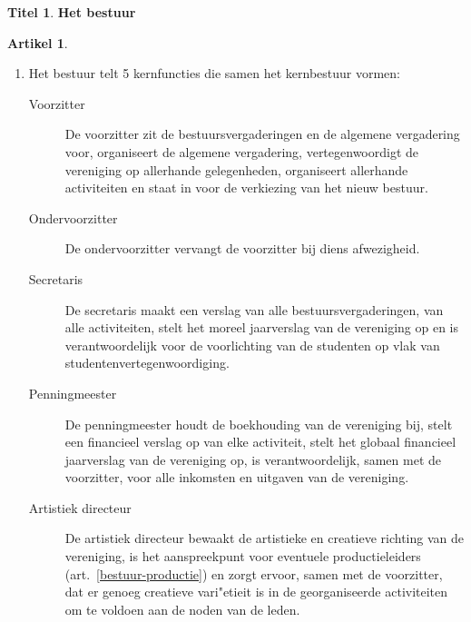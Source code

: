 \documentclass[a4paper,10pt]{article}
\theoremstyle{definition}
\newtheorem{titel}{\newline\Large Titel}
\newtheorem{artikel}{\large Artikel}
\newcommand{\ttext}[1]{\Large \textbf{#1} \normalsize}
\newcommand{\ttextenum}{\mbox{}}
\begin{document}
\begin{titel}\ttext{Het bestuur}

  \begin{artikel}\ttextenum
    \begin{enumerate}
      \item Het bestuur telt 5 kernfuncties die samen het kernbestuur vormen:
      \begin{description}
        \item[Voorzitter]
          De voorzitter zit de bestuursvergaderingen en de algemene vergadering voor, organiseert de algemene vergadering, vertegenwoordigt de vereniging op allerhande gelegenheden, organiseert allerhande activiteiten en staat in voor de verkiezing van het nieuw bestuur.
        \item[Ondervoorzitter]
          De ondervoorzitter vervangt de voorzitter bij diens afwezigheid.
        \item[Secretaris]
          De secretaris maakt een verslag van alle bestuursvergaderingen, van alle activiteiten, stelt het moreel jaarverslag van de vereniging op en is verantwoordelijk voor de voorlichting van de studenten op vlak van studentenvertegenwoordiging.
        \item[Penningmeester]
          De penningmeester houdt de boekhouding van de vereniging bij, stelt een financieel verslag op van elke activiteit, stelt het globaal financieel jaarverslag van de vereniging op, is verantwoordelijk, samen met de voorzitter, voor alle inkomsten en uitgaven van de vereniging.
        \item[Artistiek directeur]
          De artistiek directeur bewaakt de artistieke en creatieve richting van de vereniging, is het aanspreekpunt voor eventuele productieleiders (art.~\ref{bestuur-productie}) en zorgt ervoor, samen met de voorzitter, dat er genoeg creatieve vari"etieit is in de georganiseerde activiteiten om te voldoen aan de noden van de leden.
      \end{description}


\end{enumerate}
\end{artikel}
\end{titel}
\end{document}
